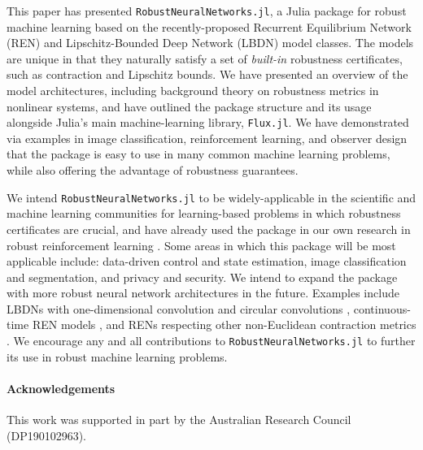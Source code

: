 This paper has presented \verb|RobustNeuralNetworks.jl|, a Julia package for robust machine learning based on the recently-proposed Recurrent Equilibrium Network (REN) and Lipschitz-Bounded Deep Network (LBDN) model classes. The models are unique in that they naturally satisfy a set of \textit{built-in} robustness certificates, such as contraction and Lipschitz bounds. We have presented an overview of the model architectures, including background theory on robustness metrics in nonlinear systems, and have outlined the package structure and its usage alongside Julia's main machine-learning library, \verb|Flux.jl|. We have demonstrated via examples in image classification, reinforcement learning, and observer design that the package is easy to use in many common machine learning problems, while also offering the advantage of robustness guarantees.

We intend \verb|RobustNeuralNetworks.jl| to be widely-applicable in the scientific and machine learning communities for learning-based problems in which robustness certificates are crucial, and have already used the package in our own research in robust reinforcement learning \cite{Barbara++2023}. Some areas in which this package will be most applicable include: data-driven control and state estimation, image classification and segmentation, and privacy and security. We intend to expand the package with more robust neural network architectures in the future. Examples include LBDNs with one-dimensional convolution \cite{Pauli++2022c} and circular convolutions \cite{Wang+Manchester2023}, continuous-time REN models \cite{Martinelli++2023}, and RENs respecting other non-Euclidean contraction metrics \cite{Davydov++2022}. We encourage any and all contributions to \verb|RobustNeuralNetworks.jl| to further its use in robust machine learning problems.

\paragraph*{Acknowledgements}
This work was supported in part by the Australian Research Council (DP190102963).